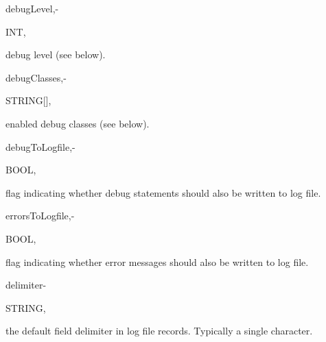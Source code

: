 \begin{minipage}{\dimexpr\textwidth-2em}
        \medskip
        \begin{minipage}[t][][b]{9.5em}debugLevel,\hfill{-}\end{minipage}
        \begin{minipage}[t][][b]{5.5em}INT,\hfill\end{minipage}
        \begin{minipage}[t][][b]{\dimexpr\textwidth-15.5em}
            debug level (see below).
        \end{minipage}\vfill

        \medskip
        \begin{minipage}[t][][b]{9.5em}debugClasses,\hfill{-}\end{minipage}
        \begin{minipage}[t][][b]{5.5em}STRING[],\hfill\end{minipage}
        \begin{minipage}[t][][b]{\dimexpr\textwidth-15.5em}
            enabled debug classes (see below).
        \end{minipage}\vfill

        \medskip
        \begin{minipage}[t][][b]{9.5em}debugToLogfile,\hfill{-}\end{minipage}
        \begin{minipage}[t][][b]{5.5em}BOOL,\hfill\end{minipage}
        \begin{minipage}[t][][b]{\dimexpr\textwidth-15.5em}
            flag indicating whether debug statements should also be written to log file.
        \end{minipage}\vfill

        \medskip
        \begin{minipage}[t][][b]{9.5em}errorsToLogfile,\hfill{-}\end{minipage}
        \begin{minipage}[t][][b]{5.5em}BOOL,\hfill\end{minipage}
        \begin{minipage}[t][][b]{\dimexpr\textwidth-15.5em}
            flag indicating whether error messages should also be written to log file.
        \end{minipage}\vfill

        \medskip
        \begin{minipage}[t][][b]{9.5em}delimiter\hfill{-}\end{minipage}
        \begin{minipage}[t][][b]{5.5em}STRING,\hfill\end{minipage}
        \begin{minipage}[t][][b]{\dimexpr\textwidth-15.5em}
            the default field delimiter in log file records. Typically a single character.
        \end{minipage}\vfill
\end{minipage}

